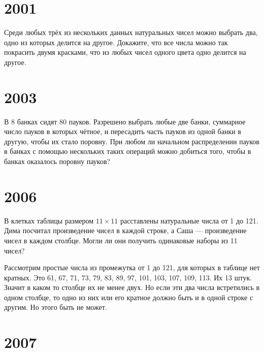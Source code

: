 \documentclass[11pt, a4paper]{template}
\begin{document}
\chapter{2001}

\begin{exercise}[M1756]
Среди любых трёх из нескольких данных натуральных чисел можно выбрать два, одно из которых делится на другое. Докажите, что все числа можно так покрасить двумя красками, что из любых чисел одного цвета одно делится на другое.
\end{exercise}

\chapter{2003}

\begin{exercise}[M1847]
В 8 банках сидят 80 пауков. Разрешено выбрать любые две банки, суммарное число пауков в которых чётное, и пересадить часть пауков из одной банки в другую, чтобы их стало поровну. При любом ли начальном распределении пауков в банках с помощью нескольких таких операций можно добиться того, чтобы в банках оказалось поровну пауков?
\end{exercise}

\chapter{2006}

\begin{exercise}[M1981]
В клетках таблицы размером $11 \times 11$ расставлены натуральные числа от 1 до 121. Дима посчитал произведение чисел в каждой строке, а Саша — произведение чисел в каждом столбце. Могли ли они получить одинаковые наборы из 11 чисел?
\end{exercise}

\begin{solution}
Рассмотрим простые числа из промежутка от 1 до 121, для которых в таблице нет кратных. Это 61, 67, 71, 73, 79, 83, 89, 97, 101, 103, 107, 109, 113. Их 13 штук. Значит в каком то столбце их не менее двух. Но если эти два числа встретились в одном столбце, то одно из них или его кратное должно быть и в одной строке с другим. Но этого быть не может.  
\end{solution}

\chapter{2007}
\end{document}
